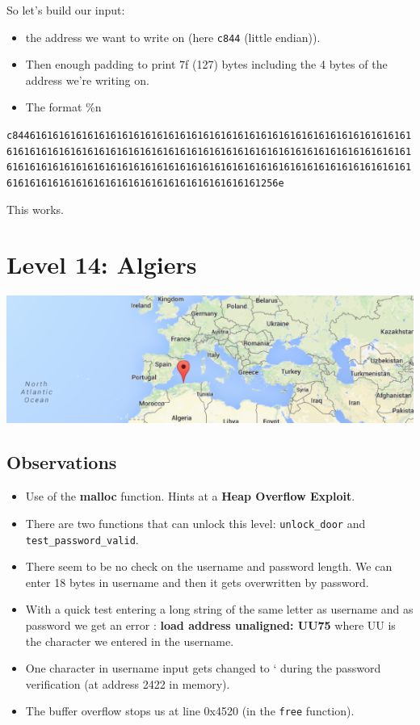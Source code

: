 \documentclass[a4paper,11pt]{article}
\begin{document}
So let's build our input:

\begin{itemize}
\itemsep1pt\parskip0pt
\item
  the address we want to write on (here \texttt{c844} (little endian)).
\item
  Then enough padding to print 7f (127) bytes including the 4 bytes of
  the address we're writing on.
\item
  The format \%n
\end{itemize}

\texttt{c8446161616161616161616161616161616161616161616161616161616161616161616161616161616161616161616161616161616161616161616161616161616161616161616161616161616161616161616161616161616161616161616161616161616161616161616161616161616161616161616161616161616161256e}

This works.

\section{Level 14: Algiers}\label{level-14-algiers}

\includegraphics{img/14_1.PNG}

\subsection{Observations}\label{observations-6}

\begin{itemize}
\itemsep1pt\parskip0pt
\item
  Use of the \textbf{malloc} function. Hints at a \textbf{Heap Overflow
  Exploit}.
\item
  There are two functions that can unlock this level:
  \texttt{unlock\_door} and \texttt{test\_password\_valid}.
\item
  There seem to be no check on the username and password length. We can
  enter 18 bytes in username and then it gets overwritten by password.
\item
  With a quick test entering a long string of the same letter as
  username and as password we get an error : \textbf{load address
  unaligned: UU75} where UU is the character we entered in the username.
\item
  One character in username input gets changed to ` during the password
  verification (at address 2422 in memory).
\item
  The buffer overflow stops us at line 0x4520 (in the \texttt{free}
  function).
\end{itemize}
\end{document}

